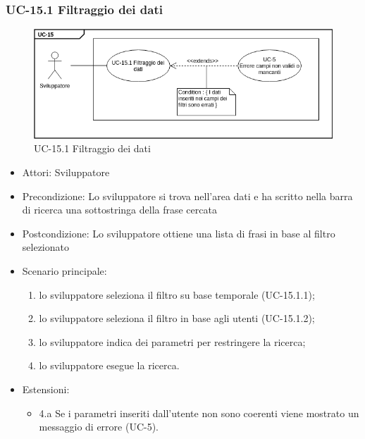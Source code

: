 	\subsubsection{UC-15.1 Filtraggio dei dati}	
		\begin{figure}[h]
			\centering
			\includegraphics[scale=0.7]{images/UC-15_1.png}
			\caption{UC-15.1 Filtraggio dei dati}
		\end{figure}	
		\begin{itemize}
			\item Attori: Sviluppatore
			\item Precondizione: Lo sviluppatore si trova nell'area dati e ha scritto nella barra di ricerca una sottostringa della frase cercata
			\item Postcondizione: Lo sviluppatore ottiene una lista di frasi in base al filtro selezionato
			\item Scenario principale:
				\begin{enumerate}
					\item lo sviluppatore seleziona il filtro su base temporale (UC-15.1.1);
					\item lo sviluppatore seleziona il filtro in base agli utenti (UC-15.1.2);
					\item lo sviluppatore indica dei parametri per restringere la ricerca;
					\item lo sviluppatore esegue la ricerca.
				\end{enumerate}	
			\item Estensioni:
				\begin{itemize}
					\item 4.a Se i parametri inseriti dall'utente non sono coerenti viene mostrato un messaggio di errore (UC-5).
				\end{itemize}		
		\end{itemize}
	
	
